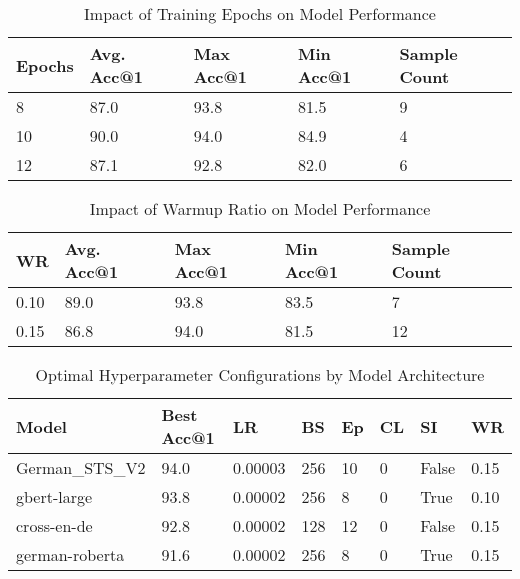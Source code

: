 \begin{table}[htbp]
\centering
\caption{Impact of Training Epochs on Model Performance}
\label{tab:epochs_impact}
\begin{tabularx}{\textwidth}{XXXXX}
\toprule
Epochs & Avg. Acc@1 & Max Acc@1 & Min Acc@1 & Sample Count \\
\midrule
8 & 87.0 & 93.8 & 81.5 & 9 \\
10 & 90.0 & 94.0 & 84.9 & 4 \\
12 & 87.1 & 92.8 & 82.0 & 6 \\
\bottomrule
\end{tabularx}
\end{table}

\begin{table}[htbp]
\centering
\caption{Impact of Warmup Ratio on Model Performance}
\label{tab:warmup_impact}
\begin{tabularx}{\textwidth}{XXXXX}
\toprule
WR & Avg. Acc@1 & Max Acc@1 & Min Acc@1 & Sample Count \\
\midrule
0.10 & 89.0 & 93.8 & 83.5 & 7 \\
0.15 & 86.8 & 94.0 & 81.5 & 12 \\
\bottomrule
\end{tabularx}
\end{table}

\begin{table}[htbp]
\centering
\caption{Optimal Hyperparameter Configurations by Model Architecture}
\label{tab:best_hyperparameters}
\begin{tabularx}{\textwidth}{lXXXXXXX}
\toprule
Model & Best Acc@1 & LR & BS & Ep & CL & SI & WR \\
\midrule
German\_STS\_V2 & 94.0 & 0.00003 & 256 & 10 & 0 & False & 0.15 \\
gbert-large & 93.8 & 0.00002 & 256 & 8 & 0 & True & 0.10 \\
cross-en-de & 92.8 & 0.00002 & 128 & 12 & 0 & False & 0.15 \\
german-roberta & 91.6 & 0.00002 & 256 & 8 & 0 & True & 0.15 \\
\bottomrule
\end{tabularx}
\end{table}
